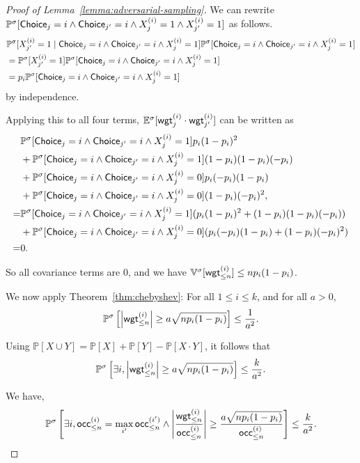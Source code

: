 \documentclass[a4paper,USenglish,cleveref, autoref, thm-restate]{lipics-v2021}
\newcommand*{\pr}{\mathbb{P}}
\newcommand*{\expect}{\mathbb{E}}
\newcommand*{\variance}{\mathbb{V}}
\def\Choice{\textrm{\sf Choice}}
\def\wgt{\textrm{\sf wgt}}
\def\occ{\textrm{\sf occ}}
\begin{document}
\begin{proof}[Proof of Lemma~\ref{lemma:adversarial-sampling}]
  We can rewrite $\pr^\sigma[ \Choice_j=i \land \Choice_{j'}=i \land X_j^{(i)}=1 \land X_{j'}^{(i)}=1]$ as follows.
   \begin{align*}
     & \pr^\sigma[ X_{j'}^{(i)} = 1 \mid \Choice_j=i \land \Choice_{j'}=i \land X_j^{(i)}=1  ] \pr^\sigma[\Choice_j=i \land \Choice_{j'}=i \land X_j^{(i)}=1]\\
     &=\pr^\sigma[ X_{j'}^{(i)} = 1 ] \pr^\sigma[\Choice_j=i \land \Choice_{j'}=i \land X_j^{(i)}=1]\\
     &= p_i \pr^\sigma[\Choice_j=i \land \Choice_{j'}=i \land X_j^{(i)}=1]
  \end{align*}
  by independence.
  
  Applying this to all four terms, $\expect^\sigma[\wgt_j^{(i)} \cdot \wgt_{j'}^{(i)}]$ can be written as
  \begin{align*}
    &\pr^\sigma[\Choice_j=i \land \Choice_{j'}=i \land X_j^{(i)}=1]p_i (1-p_i)^2\\
    &+\pr^\sigma[\Choice_j=i \land \Choice_{j'}=i \land X_j^{(i)}=1](1-p_i) (1-p_i)(-p_i)\\
    &+\pr^\sigma[\Choice_j=i \land \Choice_{j'}=i \land X_j^{(i)}=0]p_i (-p_i)(1-p_i)\\
    &+\pr^\sigma[\Choice_j=i \land \Choice_{j'}=i \land X_j^{(i)}=0](1-p_i) (-p_i)^2,\\
    =&\pr^\sigma[\Choice_j=i \land \Choice_{j'}=i \land X_j^{(i)}=1](p_i (1-p_i)^2 + (1-p_i) (1-p_i)(-p_i))\\
    &+\pr^\sigma[\Choice_j=i \land \Choice_{j'}=i \land X_j^{(i)}=0](p_i (-p_i)(1-p_i) + (1-p_i) (-p_i)^2)\\
    =&0.
  \end{align*}

  So all covariance terms are $0$, and we have $\variance^\sigma[\wgt_{\leq n}^{(i)}]\leq np_i(1-p_i)$.

  We now apply Theorem~\ref{thm:chebyshev}: For all $1\leq i \leq k$, and for all $a>0$,
  \[
    \pr^\sigma\left[ \left\lvert\wgt^{(i)}_{\leq n}\right\rvert \geq a\sqrt{np_i(1-p_i)} \right] \leq \frac{1}{a^2}.
  \]

  Using $\pr[X \cup Y] = \pr[X] + \pr[Y] - \pr[X \cdot Y]$, it follows that   
  \[
    \pr^\sigma\left[ \exists i, \left\lvert{\wgt^{(i)}_{\leq n}}\right\rvert \geq {a\sqrt{np_i(1-p_i)}} \right] \leq \frac{k}{a^2}.
  \]
  
  We have,
  \[
    \pr^\sigma\left[ 
        \exists i, 
        \occ_{\leq n}^{(i)} = \max_{i'}\occ_{\leq n}^{(i')}
        \land \left\lvert\frac{\wgt^{(i)}_{\leq n}}{\occ^{(i)}_{\leq n}}\right\rvert 
              \geq \frac{a\sqrt{np_i(1-p_i)}}{{\occ^{(i)}_{\leq n}}} \right] 
        \leq \frac{k}{a^2}.
  \]
  

\end{proof}
\end{document}
